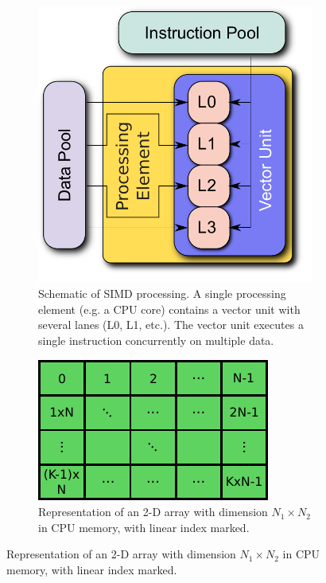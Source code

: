 \documentclass[12pt]{ussci}
\begin{document}
\begin{figure}[htb]
  \centering
  \begin{subfigure}[t]{0.54\linewidth}
      \includegraphics[width=\textwidth]{SIMD.pdf}
      \caption{Schematic of SIMD processing.  A single processing element (e.g. a CPU core) contains a vector unit with several lanes (L0, L1, etc.).  The vector unit executes a single instruction concurrently on multiple data.}
      \label{F:SIMD}
  \end{subfigure}
  \hfill
  \begin{subfigure}[t]{0.43\linewidth}
      \includegraphics[width=\textwidth]{mem_access.pdf}
      \caption{Representation of an 2-D array with dimension $N_1 \times N_2$ in CPU memory, with linear index marked.}
      \label{F:mem}
  \end{subfigure}
\end{figure}
\end{document}
